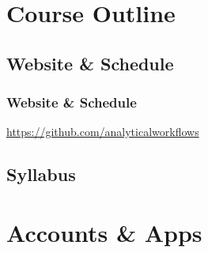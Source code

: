 \documentclass{beamer}
\begin{document}
\section{Course Outline}


\subsection{Website \& Schedule}

\begin{frame}
    \frametitle{Website \& Schedule}
    \url{https://github.com/analyticalworkflows}

\end{frame}


\subsection{Syllabus}


\section{Accounts \& Apps}

\end{document}
